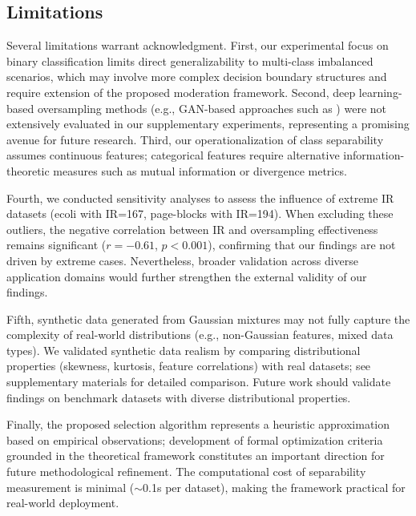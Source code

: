 \documentclass{ijSmartGrid}
\theoremstyle{definition}
\begin{document}
\subsection{Limitations}
\indent Several limitations warrant acknowledgment. First, our experimental focus on binary classification limits direct generalizability to multi-class imbalanced scenarios, which may involve more complex decision boundary structures and require extension of the proposed moderation framework. Second, deep learning-based oversampling methods (e.g., GAN-based approaches such as \cite{engelmann2021conditional,dablain2021deepsmote}) were not extensively evaluated in our supplementary experiments, representing a promising avenue for future research. Third, our operationalization of class separability assumes continuous features; categorical features require alternative information-theoretic measures such as mutual information or divergence metrics.

Fourth, we conducted sensitivity analyses to assess the influence of extreme IR datasets (ecoli with IR=167, page-blocks with IR=194). When excluding these outliers, the negative correlation between IR and oversampling effectiveness remains significant ($r = -0.61$, $p < 0.001$), confirming that our findings are not driven by extreme cases. Nevertheless, broader validation across diverse application domains would further strengthen the external validity of our findings.

Fifth, synthetic data generated from Gaussian mixtures may not fully capture the complexity of real-world distributions (e.g., non-Gaussian features, mixed data types). We validated synthetic data realism by comparing distributional properties (skewness, kurtosis, feature correlations) with real datasets; see supplementary materials for detailed comparison. Future work should validate findings on benchmark datasets with diverse distributional properties.

Finally, the proposed selection algorithm represents a heuristic approximation based on empirical observations; development of formal optimization criteria grounded in the theoretical framework constitutes an important direction for future methodological refinement. The computational cost of separability measurement is minimal ($\sim$0.1s per dataset), making the framework practical for real-world deployment.

\end{document}
